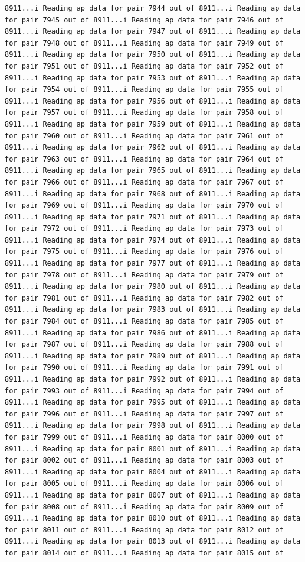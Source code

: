 \documentclass[
]{article}
\begin{document}
\begin{verbatim}
8911...i Reading ap data for pair 7944 out of 8911...i Reading ap data for pair 7945 out of 8911...i Reading ap data for pair 7946 out of 8911...i Reading ap data for pair 7947 out of 8911...i Reading ap data for pair 7948 out of 8911...i Reading ap data for pair 7949 out of 8911...i Reading ap data for pair 7950 out of 8911...i Reading ap data for pair 7951 out of 8911...i Reading ap data for pair 7952 out of 8911...i Reading ap data for pair 7953 out of 8911...i Reading ap data for pair 7954 out of 8911...i Reading ap data for pair 7955 out of 8911...i Reading ap data for pair 7956 out of 8911...i Reading ap data for pair 7957 out of 8911...i Reading ap data for pair 7958 out of 8911...i Reading ap data for pair 7959 out of 8911...i Reading ap data for pair 7960 out of 8911...i Reading ap data for pair 7961 out of 8911...i Reading ap data for pair 7962 out of 8911...i Reading ap data for pair 7963 out of 8911...i Reading ap data for pair 7964 out of 8911...i Reading ap data for pair 7965 out of 8911...i Reading ap data for pair 7966 out of 8911...i Reading ap data for pair 7967 out of 8911...i Reading ap data for pair 7968 out of 8911...i Reading ap data for pair 7969 out of 8911...i Reading ap data for pair 7970 out of 8911...i Reading ap data for pair 7971 out of 8911...i Reading ap data for pair 7972 out of 8911...i Reading ap data for pair 7973 out of 8911...i Reading ap data for pair 7974 out of 8911...i Reading ap data for pair 7975 out of 8911...i Reading ap data for pair 7976 out of 8911...i Reading ap data for pair 7977 out of 8911...i Reading ap data for pair 7978 out of 8911...i Reading ap data for pair 7979 out of 8911...i Reading ap data for pair 7980 out of 8911...i Reading ap data for pair 7981 out of 8911...i Reading ap data for pair 7982 out of 8911...i Reading ap data for pair 7983 out of 8911...i Reading ap data for pair 7984 out of 8911...i Reading ap data for pair 7985 out of 8911...i Reading ap data for pair 7986 out of 8911...i Reading ap data for pair 7987 out of 8911...i Reading ap data for pair 7988 out of 8911...i Reading ap data for pair 7989 out of 8911...i Reading ap data for pair 7990 out of 8911...i Reading ap data for pair 7991 out of 8911...i Reading ap data for pair 7992 out of 8911...i Reading ap data for pair 7993 out of 8911...i Reading ap data for pair 7994 out of 8911...i Reading ap data for pair 7995 out of 8911...i Reading ap data for pair 7996 out of 8911...i Reading ap data for pair 7997 out of 8911...i Reading ap data for pair 7998 out of 8911...i Reading ap data for pair 7999 out of 8911...i Reading ap data for pair 8000 out of 8911...i Reading ap data for pair 8001 out of 8911...i Reading ap data for pair 8002 out of 8911...i Reading ap data for pair 8003 out of 8911...i Reading ap data for pair 8004 out of 8911...i Reading ap data for pair 8005 out of 8911...i Reading ap data for pair 8006 out of 8911...i Reading ap data for pair 8007 out of 8911...i Reading ap data for pair 8008 out of 8911...i Reading ap data for pair 8009 out of 8911...i Reading ap data for pair 8010 out of 8911...i Reading ap data for pair 8011 out of 8911...i Reading ap data for pair 8012 out of 8911...i Reading ap data for pair 8013 out of 8911...i Reading ap data for pair 8014 out of 8911...i Reading ap data for pair 8015 out of 
\end{verbatim}
\end{document}
